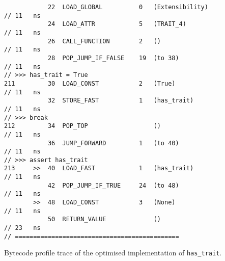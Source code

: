\begin{code}
\begin{verbatim}
            22  LOAD_GLOBAL          0   (Extensibility)                                    // 11   ns
            24  LOAD_ATTR            5   (TRAIT_4)                                          // 11   ns
            26  CALL_FUNCTION        2   ()                                                 // 11   ns
            28  POP_JUMP_IF_FALSE    19  (to 38)                                            // 11   ns
// >>> has_trait = True
211         30  LOAD_CONST           2   (True)                                             // 11   ns
            32  STORE_FAST           1   (has_trait)                                        // 11   ns
// >>> break
212         34  POP_TOP                  ()                                                 // 11   ns
            36  JUMP_FORWARD         1   (to 40)                                            // 11   ns
// >>> assert has_trait
213     >>  40  LOAD_FAST            1   (has_trait)                                        // 11   ns
            42  POP_JUMP_IF_TRUE     24  (to 48)                                            // 11   ns
        >>  48  LOAD_CONST           3   (None)                                             // 11   ns
            50  RETURN_VALUE             ()                                                 // 23   ns
// =============================================
    \end{verbatim}
    \caption{Bytecode profile trace of the optimised implementation of \texttt{has_trait}.}
    \label{listing:bytecode-profiles-hastrait-optimised}
\end{code}










